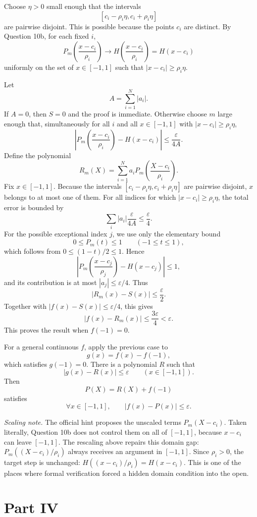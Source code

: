 \documentclass[11pt,a4paper]{article}
\begin{document}
Choose $\eta>0$ small enough that the intervals
\[
  [c_i-\rho_i\eta,c_i+\rho_i\eta]
\]
are pairwise disjoint.  This is possible because the points $c_i$ are distinct.  By Question 10b, for each fixed $i$,
\[
  P_m\left(\frac{x-c_i}{\rho_i}\right)
  \longrightarrow
  H\left(\frac{x-c_i}{\rho_i}\right)=H(x-c_i)
\]
uniformly on the set of $x\in[-1,1]$ such that $|x-c_i|\ge \rho_i\eta$.

Let
\[
  A=\sum_{i=1}^N |a_i|.
\]
If $A=0$, then $S=0$ and the proof is immediate.  Otherwise choose $m$ large enough that, simultaneously for all $i$ and all $x\in[-1,1]$ with $|x-c_i|\ge \rho_i\eta$,
\[
  \left|P_m\left(\frac{x-c_i}{\rho_i}\right)-H(x-c_i)\right|
  \le \frac{\varepsilon}{4A}.
\]
Define the polynomial
\[
  R_m(X)=\sum_{i=1}^N a_iP_m\left(\frac{X-c_i}{\rho_i}\right).
\]
Fix $x\in[-1,1]$.  Because the intervals $[c_i-\rho_i\eta,c_i+\rho_i\eta]$ are pairwise disjoint, $x$ belongs to at most one of them.
For all indices for which $|x-c_i|\ge \rho_i\eta$, the total error is bounded by
\[
  \sum_i |a_i|\frac{\varepsilon}{4A}\le\frac\varepsilon4.
\]
For the possible exceptional index $j$, we use only the elementary bound
\[
  0\le P_m(t)\le1\qquad(-1\le t\le1),
\]
which follows from $0\le(1-t)/2\le1$.  Hence
\[
  \left|P_m\left(\frac{x-c_j}{\rho_j}\right)-H(x-c_j)\right|\le1,
\]
and its contribution is at most $|a_j|\le\varepsilon/4$.  Thus
\[
  |R_m(x)-S(x)|\le\frac\varepsilon2.
\]
Together with $|f(x)-S(x)|\le\varepsilon/4$, this gives
\[
  |f(x)-R_m(x)|\le\frac{3\varepsilon}{4}<\varepsilon.
\]
This proves the result when $f(-1)=0$.

For a general continuous $f$, apply the previous case to
\[
  g(x)=f(x)-f(-1),
\]
which satisfies $g(-1)=0$.  There is a polynomial $R$ such that
\[
  |g(x)-R(x)|\le\varepsilon
  \qquad(x\in[-1,1]).
\]
Then
\[
  P(X)=R(X)+f(-1)
\]
satisfies
\[
  \boxed{\forall x\in[-1,1],\qquad |f(x)-P(x)|\le\varepsilon.}
\]

\medskip
\noindent\emph{Scaling note.}  The official hint proposes the unscaled terms
$P_m(X-c_i)$.  Taken literally, Question 10b does not control them on all of
$[-1,1]$, because $x-c_i$ can leave $[-1,1]$.  The rescaling above repairs
this domain gap: $P_m((X-c_i)/\rho_i)$ always receives an argument in
$[-1,1]$.  Since $\rho_i>0$, the target step is unchanged:
$H((x-c_i)/\rho_i)=H(x-c_i)$.  This is one of the places where formal
verification forced a hidden domain condition into the open.

\section{Part IV}
\end{document}
